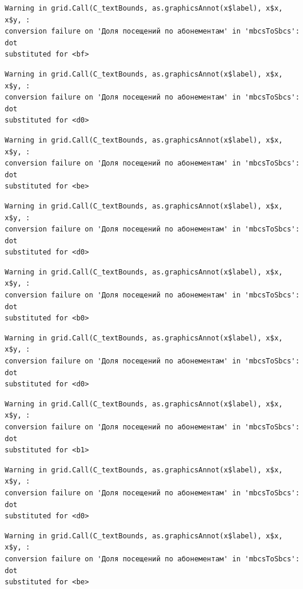 \documentclass[
  letterpaper,
  DIV=11,
  numbers=noendperiod]{scrartcl}
\begin{document}
\begin{verbatim}
Warning in grid.Call(C_textBounds, as.graphicsAnnot(x$label), x$x, x$y, :
conversion failure on 'Доля посещений по абонементам' in 'mbcsToSbcs': dot
substituted for <bf>
\end{verbatim}

\begin{verbatim}
Warning in grid.Call(C_textBounds, as.graphicsAnnot(x$label), x$x, x$y, :
conversion failure on 'Доля посещений по абонементам' in 'mbcsToSbcs': dot
substituted for <d0>
\end{verbatim}

\begin{verbatim}
Warning in grid.Call(C_textBounds, as.graphicsAnnot(x$label), x$x, x$y, :
conversion failure on 'Доля посещений по абонементам' in 'mbcsToSbcs': dot
substituted for <be>
\end{verbatim}

\begin{verbatim}
Warning in grid.Call(C_textBounds, as.graphicsAnnot(x$label), x$x, x$y, :
conversion failure on 'Доля посещений по абонементам' in 'mbcsToSbcs': dot
substituted for <d0>
\end{verbatim}

\begin{verbatim}
Warning in grid.Call(C_textBounds, as.graphicsAnnot(x$label), x$x, x$y, :
conversion failure on 'Доля посещений по абонементам' in 'mbcsToSbcs': dot
substituted for <b0>
\end{verbatim}

\begin{verbatim}
Warning in grid.Call(C_textBounds, as.graphicsAnnot(x$label), x$x, x$y, :
conversion failure on 'Доля посещений по абонементам' in 'mbcsToSbcs': dot
substituted for <d0>
\end{verbatim}

\begin{verbatim}
Warning in grid.Call(C_textBounds, as.graphicsAnnot(x$label), x$x, x$y, :
conversion failure on 'Доля посещений по абонементам' in 'mbcsToSbcs': dot
substituted for <b1>
\end{verbatim}

\begin{verbatim}
Warning in grid.Call(C_textBounds, as.graphicsAnnot(x$label), x$x, x$y, :
conversion failure on 'Доля посещений по абонементам' in 'mbcsToSbcs': dot
substituted for <d0>
\end{verbatim}

\begin{verbatim}
Warning in grid.Call(C_textBounds, as.graphicsAnnot(x$label), x$x, x$y, :
conversion failure on 'Доля посещений по абонементам' in 'mbcsToSbcs': dot
substituted for <be>
\end{verbatim}
\end{document}
